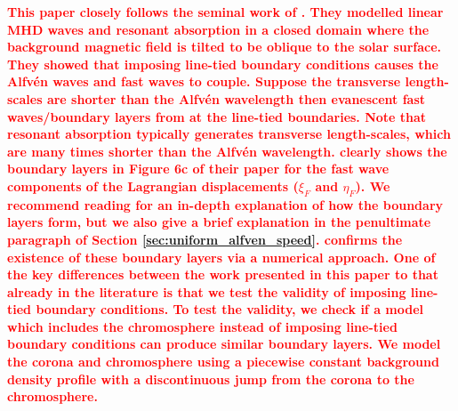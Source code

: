 \documentclass[linenumbers]{aastex63}
\newcommand{\alexedit}[1]{\textcolor{red}{\textbf{#1}}}
\begin{document}
\alexedit{This paper closely follows the seminal work of \citet{Halberstadt1993,Goedbloed1994,Halberstadt1995}. They modelled linear MHD waves and resonant absorption in a closed domain where the background magnetic field is tilted to be oblique to the solar surface. They showed that imposing line-tied boundary conditions causes the Alfv\'en waves and fast waves to couple. Suppose the transverse length-scales are shorter than the Alfv\'en wavelength then evanescent fast waves/boundary layers from at the line-tied boundaries. Note that resonant absorption typically generates transverse length-scales, which are many times shorter than the Alfv\'en wavelength. \citet{Goedbloed1994} clearly shows the boundary layers in Figure 6c of their paper for the fast wave components of the Lagrangian displacements ($\xi_F$ and $\eta_F$). We recommend reading \citet{Goedbloed1994} for an in-depth explanation of how the boundary layers form, but we also give a brief explanation in the penultimate paragraph of Section \ref{sec:uniform_alfven_speed}. \citet{Arregui2003} confirms the existence of these boundary layers via a numerical approach. One of the key differences between the work presented in this paper to that already in the literature is that we test the validity of imposing line-tied boundary conditions. To test the validity, we check if a model which includes the chromosphere instead of imposing line-tied boundary conditions can produce similar boundary layers. We model the corona and chromosphere using a piecewise constant background density profile with a discontinuous jump from the corona to the chromosphere.}

\end{document}
